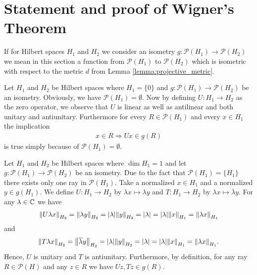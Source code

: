 \section{Statement and proof of Wigner's Theorem}

If for Hilbert spaces $H_1$ and $H_2$ we consider an isometry $g: \mathcal{P}(H_1) \to \mathcal{P}(H_2)$ we mean in this section a function from $\mathcal{P}(H_1)$ to $\mathcal{P}(H_2)$ which is isometric with respect to the metric $d$ from Lemma \ref{lemma:projective_metric}.

\begin{example} \label{example:zerodim}
	Let $H_1$ and $H_2$ be Hilbert spaces where $H_1 = \{0\}$ and $g: \mathcal{P}(H_1) \to \mathcal{P}(H_2)$ be an isometry. Obviously, we have $\mathcal{P}(H_1) = \emptyset$. Now by defining $U: H_1 \to H_2$ as the zero operator, we observe that $U$ is linear as well as antilinear and both unitary and antiunitary. Furthermore for every $R \in \mathcal{P}(H_1)$ and every $x \in H_1$ the implication 
	\begin{align*}
		x \in R \Rightarrow Ux \in g(R)
	\end{align*} 
	is true simply because of $\mathcal{P}(H_1) = \emptyset$.
\end{example}

\begin{example} \label{example:onedim}
	Let $H_1$ and $H_2$ be Hilbert spaces where $\dim H_1 = 1$ and let $g: \mathcal{P}(H_1) \to \mathcal{P}(H_2)$ be an isometry. Due to the fact that $\mathcal{P}(H_1) = \{H_1\}$ there exists only one ray in $\mathcal{P}(H_1)$. Take a normalized $x \in H_1$ and a normalized $y \in g(H_1)$. We define $U: H_1 \to H_2$ by $\lambda x \mapsto \lambda y$ and $T: H_1 \to H_2$ by $\lambda x \mapsto \overline{\lambda} y$. For any $\lambda \in \C$ we have
	\begin{align*}
		\norm[H_2]{U\lambda x} = \norm[H_2]{\lambda y} = \vbraces{\lambda} \norm[H_2]{y} = \vbraces{\lambda} = \vbraces{\lambda} \norm[H_1]{x} = \norm[H_1]{\lambda x}
	\end{align*}
	and 
	\begin{align*}
		\norm[H_2]{T\lambda x} = \norm[H_2]{\overline{\lambda} y} = \vbraces{\lambda} \norm[H_2]{y} = \vbraces{\lambda} = \vbraces{\lambda} \norm[H_1]{x} = \norm[H_1]{\lambda x}.
	\end{align*}
	Hence, $U$ is unitary and $T$ is antiunitary. Furthermore, by definition, for any ray $R \in \mathcal{P}(H)$ and any $z \in R$ we have $Uz, Tz \in g(R)$. 
\end{example}

